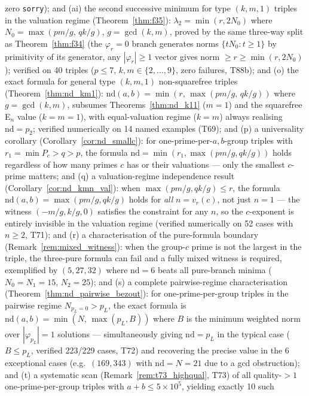 \documentclass[12pt]{article}
\theoremstyle{definition}
\begin{document}
zero \texttt{sorry});
and (ai) the second successive minimum for type $(k,m,1)$ triples in the
valuation regime (Theorem~\ref{thm:f35}):
$\lambda_2 = \min(r, 2N_0)$ where $N_0 = \max(pm/g,\, qk/g)$, $g = \gcd(k,m)$,
proved by the same three-way split as Theorem~\ref{thm:f34}
(the $\varphi_r=0$ branch generates norms $\{tN_0 : t \ge 1\}$ by primitivity of its
generator, any $|\varphi_r| \ge 1$ vector gives norm $\ge r \ge \min(r,2N_0)$);
verified on 40 triples ($p \le 7$, $k,m \in \{2,\ldots,9\}$, zero failures, T88b);
and (o) the exact formula for general type $(k,m,1)$
non-squarefree triples (Theorem~\ref{thm:nd_km1}):
$\mathrm{nd}(a,b) = \min(r,\, \max(pm/g,\, qk/g))$ where $g = \gcd(k,m)$,
subsumes Theorems~\ref{thm:nd_k11} ($m=1$) and the squarefree E$_n$ value ($k=m=1$),
with equal-valuation regime ($k=m$) always realising $\mathrm{nd} = p_2$;
verified numerically on 14 named examples (T69); and (p) a universality
corollary (Corollary~\ref{cor:nd_smallc}): for one-prime-per-$a,b$-group triples
with $r_1 = \min P_c > q > p$, the formula $\mathrm{nd} = \min(r_1, \max(pm/g, qk/g))$
holds regardless of how many primes $c$ has or their valuations — only
the smallest $c$-prime matters; and (q) a valuation-regime independence result
(Corollary~\ref{cor:nd_kmn_val}): when $\max(pm/g, qk/g) \le r$, the formula
$\mathrm{nd}(a,b) = \max(pm/g, qk/g)$ holds for \emph{all} $n = v_r(c)$, not just
$n=1$ — the witness $(-m/g, k/g, 0)$ satisfies the constraint for any $n$, so the
$c$-exponent is entirely invisible in the valuation regime (verified numerically on
52 cases with $n \ge 2$, T71); and (r) a characterisation of the pure-formula
boundary (Remark~\ref{rem:mixed_witness}): when the group-$c$ prime is not the
largest in the triple, the three-pure formula can fail and a fully mixed witness is
required, exemplified by $(5,27,32)$ where $\mathrm{nd} = 6$ beats all pure-branch
minima ($N_0 = N_1 = 15$, $N_2 = 25$); and (s) a complete pairwise-regime characterisation
(Theorem~\ref{thm:nd_pairwise_bezout}): for one-prime-per-group triples in the pairwise
regime $N_{p_L=0} > p_L$, the exact formula is
$\mathrm{nd}(a,b) = \min(N,\, \max(p_L, B))$ where $B$ is the minimum weighted norm over
$|\varphi_{p_L}|=1$ solutions — simultaneously giving $\mathrm{nd} = p_L$ in the typical case
($B \le p_L$, verified 223/229 cases, T72) and recovering the precise value in the 6 exceptional
cases (e.g.\ $(169,343)$ with $\mathrm{nd} = N = 21$ due to a gcd obstruction);
and (t) a systematic scan (Remark~\ref{rem:t73_highqual}, T73) of all quality-$>1$
one-prime-per-group triples with $a+b \le 5\times 10^5$, yielding exactly 10 such
\end{document}
